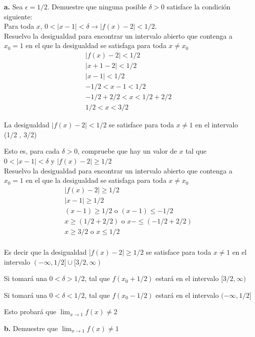\documentclass[12pt, letterpaper]{article}
\begin{document}
\textbf{a.} Sea $\epsilon = 1/2$. Demuestre que ninguna posible $\delta > 0$ satisface la condición siguiente:\\
Para toda $x$, $0 < | x - 1| < \delta \rightarrow | f(x) - 2 |< 1/2.$\\

Resuelvo la desigualdad para encontrar un intervalo abierto que contenga a $x_0 = 1$ en el que la desigualdad se satisfaga para toda $x \neq x_0$
\begin{align*}
	| f(x) - 2 |< 1/2 \\
	| x + 1 - 2 |< 1/2\\
	| x - 1 |< 1/2\\
	-1/2< x - 1< 1/2\\
	-1/2+ 2/2 < x < 1/2+2/2\\
	1/2 < x < 3/2
\end{align*}

La desigualdad 	$| f(x) - 2 |< 1/2$ se satisface para toda $x\neq 1$ en el intervalo (1/2 , 3/2)

Esto es, para cada $\delta > 0$, compruebe que hay un valor de $x$ tal que \\
 $0 < | x - 1| < \delta$ y $| f(x) - 2 |\geq 1/2$\\

Resuelvo la desigualdad para encontrar un intervalo abierto que contenga a $x_0 = 1$ en el que la desigualdad se satisfaga para toda $x \neq x_0$
\begin{align*}
	| f(x) - 2 | \geq 1/2 \\
	| x - 1 | \geq 1/2 \\
	 (x - 1) \geq 1/2 \text{ o }  (x-1)\leq -1/2\\
		x  \geq (1/2+2/2) \text{ o }  x-\leq (-1/2+ 2/2)\\
		x  \geq 3/2 \text{ o }  x \leq 1/2\\
\end{align*}

Es decir que la desigualdad |$ f(x) - 2 | \geq 1/2$ se satisface para toda $x\neq 1$ en el intervalo $(-\infty, 1/2] \cup [3/2, \infty)  $

Si tomará una $0< \delta > 1/2$, tal que $f(x_0+1/2)$ estará en el intervalo $[3/2, \infty)$

Si tomará una $0 < \delta < 1/2$, tal que $f(x_0 - 1/2)$ estará en el intervalo $(-\infty, 1/2]$


Esto probará que $\lim_{x \to 1} f(x) \neq 2$

\textbf{b.} Demuestre que $\lim_{x \to 1} f(x) \neq 1$
\end{document}
